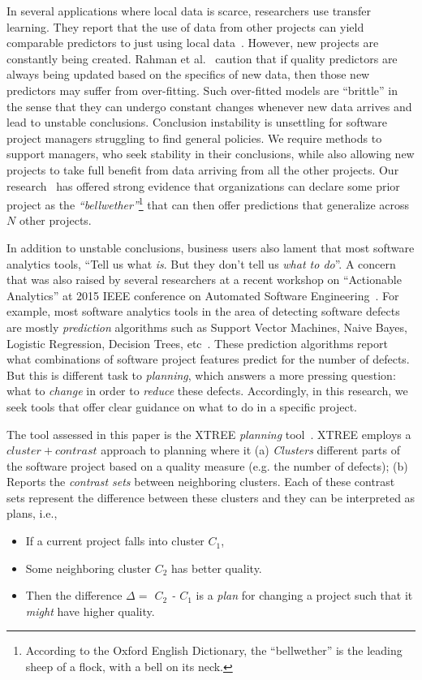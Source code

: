 \documentclass[conference]{IEEEtran}
\theoremstyle{break}
\begin{document}
In several applications where local data is scarce, researchers use transfer learning. They report that the use of data from other projects can yield comparable predictors to just using local data~\cite{peters15}. However, new projects are constantly being created. Rahman et al.~\cite{rahman12} caution that if quality predictors are always being updated based on the specifics of new data, then those new predictors may suffer from over-fitting. Such over-fitted models are ``brittle'' in the sense that they can undergo constant changes whenever new data arrives and lead to unstable conclusions. Conclusion instability is unsettling for software project managers struggling to find general policies.
We require methods to support managers, who seek stability in their conclusions, while also allowing new projects to take full benefit from data arriving from all the other projects. Our research~\cite{krishna16} has offered strong evidence that organizations can declare some prior project as  the {\em ``bellwether''}\footnote{According to the Oxford English Dictionary, the ``bellwether'' is the leading sheep of a flock, with a bell on its neck.} that can then offer predictions that generalize across $N$ other projects.


In addition to unstable conclusions, business users also lament that most software analytics tools, ``Tell us what \textit{is}. But they don't tell us \textit{what to do}''. A concern that was also raised by several researchers at a recent workshop on ``Actionable Analytics'' at 2015 IEEE conference on Automated Software Engineering~\cite{hihn15}. For example, most software analytics tools in the area of detecting software defects are mostly \textit{prediction} algorithms such as Support Vector Machines, Naive Bayes, Logistic Regression, Decision Trees, etc~\cite{scikit-learn}. These prediction algorithms report what combinations of software project features predict for the number of defects. But this is different task to \textit{planning}, which answers a more pressing question: what to {\em change} in order to {\em reduce} these defects. Accordingly, in this research, we seek tools that offer clear guidance on what to do in a specific project.

The tool assessed in this paper is the XTREE \textit{planning} tool~\cite{krishna17a}. XTREE employs a $cluster+contrast$ approach to planning where it (a) \textit{Clusters} different parts of the software project based on a quality measure (e.g. the number of defects); (b) Reports the \textit{contrast sets} between neighboring clusters. Each of these contrast sets represent the difference between these clusters and they can  be interpreted as plans, i.e., 
\begin{itemize}
	    \item If a current project falls into cluster $C_1$,
	    \item Some neighboring cluster $C_2$ has better quality.
	    \item Then the difference {\em $\Delta=$ $C_2$ - $C_1$} is a {\em plan} for changing a  project such that it \textit{might} have   higher quality.
\end{itemize}
\end{document}
